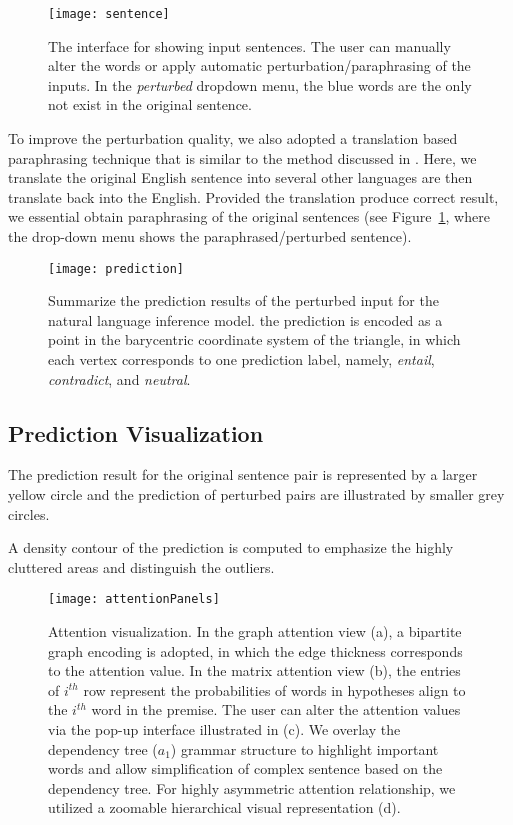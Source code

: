 \begin{figure}[htbp]
\centering
\vspace{-2mm}
 \texttt{[image: sentence]}
 \caption{
The interface for showing input sentences. The user can manually alter the words or apply automatic perturbation/paraphrasing of the inputs. In the \emph{perturbed} dropdown menu, the blue words are the only not exist in the original sentence.
 }
\label{fig:sentence}
\end{figure}

To improve the perturbation quality, we also adopted a translation based paraphrasing technique that is similar to the method discussed in \cite{mallinson2017paraphrasing}. Here, we translate the original English sentence into several other languages are then translate back into the English. Provided the translation produce correct result, we essential obtain paraphrasing of the original sentences (see Figure~\ref{fig:sentence}, where the drop-down menu shows the paraphrased/perturbed sentence).

\begin{figure}[htbp]
\centering
\vspace{-2mm}
 \texttt{[image: prediction]}
 \caption{
Summarize the prediction results of the perturbed input for the natural language inference model.
the prediction is encoded as a point in the barycentric coordinate system of the triangle, in which each vertex corresponds to one prediction label, namely, \emph{entail}, \emph{contradict}, and \emph{neutral}.
 }
\label{fig:prediction}
\end{figure}


\subsection{Prediction Visualization}

The prediction result for the original sentence pair is represented by a larger yellow circle and the prediction of perturbed pairs are illustrated by smaller grey circles.

A density contour of the prediction is computed to emphasize the highly cluttered areas and distinguish the outliers.

\begin{figure*}[t]
\centering
\vspace{-2mm}
 \texttt{[image: attentionPanels]}
  \vspace{-3mm}
 \caption{
Attention visualization. In the graph attention view (a), a bipartite graph encoding is adopted, in which the edge thickness corresponds to the attention value. In the matrix attention view (b), the entries of $i^{th}$ row represent the probabilities of words in hypotheses align to the $i^{th}$ word in the premise.
The user can alter the attention values via the pop-up interface illustrated in (c).
We overlay the dependency tree ($a_1$) grammar structure to highlight important words and allow simplification of complex sentence based on the dependency tree.
%
For highly asymmetric attention relationship, we utilized a zoomable hierarchical visual representation (d).
}
\label{fig:attentionVis}
\end{figure*}

